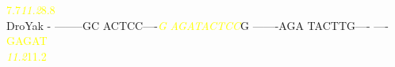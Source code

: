 \documentclass[11pt,twoside,reqno,a4paper]{article}
\begin{document}
{\hspace*{7\charwidth}\hspace*{0\charwidth}\textcolor{Yellow}{7.7}\hspace*{1\charwidth}\hspace*{1\charwidth}\hspace*{17\charwidth}\textit{\textcolor{Yellow}{11.2}}\hspace*{1\charwidth}\hspace*{1\charwidth}\hspace*{1\charwidth}\hspace*{1\charwidth}\hspace*{31\charwidth}\textcolor{Yellow}{8.8}\\
DroYak	-	--------GC	ACTCC----\textit{\textcolor{Yellow}{G}}	\textit{\textcolor{Yellow}{A}}\textit{\textcolor{Yellow}{G}}\textit{\textcolor{Yellow}{A}}\textit{\textcolor{Yellow}{T}}\textit{\textcolor{Yellow}{A}}\textit{\textcolor{Yellow}{C}}\textit{\textcolor{Yellow}{T}}\textit{\textcolor{Yellow}{C}}\textit{\textcolor{Yellow}{C}}G	-------AGA	TACTTG----	----\textcolor{Yellow}{G}\textcolor{Yellow}{A}\textcolor{Yellow}{G}\textcolor{Yellow}{A}\textcolor{Yellow}{T}\\
\hspace*{7\charwidth}\hspace*{1\charwidth}\hspace*{1\charwidth}\hspace*{20\charwidth}\textit{\textcolor{Yellow}{11.2}}\hspace*{1\charwidth}\hspace*{1\charwidth}\hspace*{1\charwidth}\hspace*{1\charwidth}\hspace*{31\charwidth}\textcolor{Yellow}{11.2}\\
}
\end{document}
